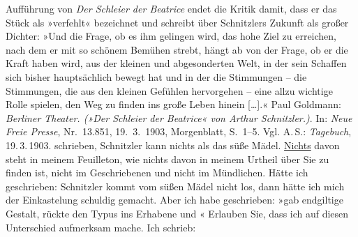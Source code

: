 \begin{ledgroupsized}[t]{13cm}
{{{                  Aufführung von \emph{Der Schleier der Beatrice}
                  endet die Kritik damit, dass er das Stück als »verfehlt« bezeichnet
                  und schreibt über Schnitzlers Zukunft als
                  großer Dichter: »Und die Frage, ob es ihm gelingen wird, das hohe Ziel zu
                     erreichen, nach dem er mit so schönem Bemühen strebt, hängt ab von der Frage,
                     ob er die Kraft haben wird, aus der kleinen und abgesonderten Welt, in der sein
                     Schaffen sich bisher hauptsächlich bewegt hat und in der die Stimmungen – die
                     Stimmungen, die aus den kleinen Gefühlen hervorgehen – eine allzu wichtige
                     Rolle spielen, den Weg zu finden ins große Leben hinein […].« Paul Goldmann: \emph{Berliner Theater. (»Der Schleier der Beatrice« von Arthur
                        Schnitzler.)}. In: \emph{Neue Freie
                        Presse}, Nr. 13.851, 19. 3. 1903, Morgenblatt,
                     S. 1–5. Vgl. A. S.: \emph{Tagebuch}, 19. 3. 1903.}}}\label{K_L03353-63h}{ } schrieben, Schnitzler kann nichts als das süße
               Mädel. \uline{Nichts} davon steht in meinem Feuilleton, wie
               nichts davon in meinem Urtheil über Sie zu finden ist, nicht im Geschriebenen und
               nicht im Mündlichen. Hätte ich geschrieben: Schnitzler kommt vom süßen Mädel nicht
               los, dann hätte ich mich der Einkastelung schuldig gemacht. Aber ich habe {\pb}geschrieben: »gab endgiltige Gestalt, rückte den Typus ins
                  Erhabene und « Erlauben Sie, dass ich auf diesen Unterschied aufmerksam mache. Ich schrieb:

\end{ledgroupsized}
